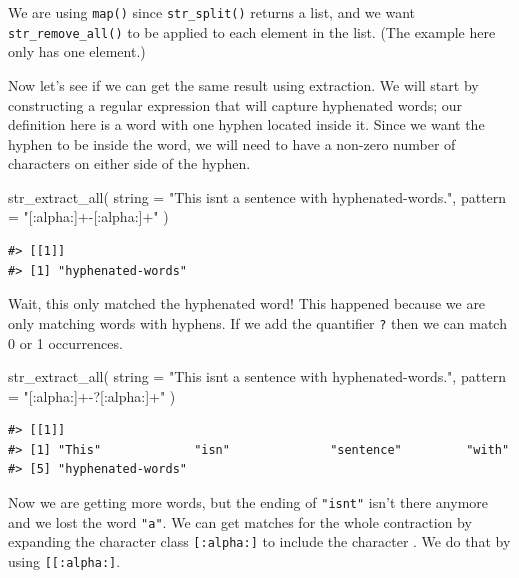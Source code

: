\documentclass[
]{krantz}
\makeatletter
\newenvironment{Shaded}{\begin{snugshade}}{\end{snugshade}}
\newcommand{\AttributeTok}[1]{\textcolor[rgb]{0.77,0.63,0.00}{#1}}
\newcommand{\FunctionTok}[1]{\textcolor[rgb]{0.00,0.00,0.00}{#1}}
\newcommand{\NormalTok}[1]{#1}
\newcommand{\StringTok}[1]{\textcolor[rgb]{0.31,0.60,0.02}{#1}}
\newenvironment{kframe}{%
\medskip{}
\setlength{\fboxsep}{.8em}
 \def\at@end@of@kframe{}%
 \ifinner\ifhmode%
  \def\at@end@of@kframe{\end{minipage}}%
  \begin{minipage}{\columnwidth}%
 \fi\fi%
 \def\FrameCommand##1{\hskip\@totalleftmargin \hskip-\fboxsep
 \colorbox{shadecolor}{##1}\hskip-\fboxsep
     \hskip-\linewidth \hskip-\@totalleftmargin \hskip\columnwidth}%
 \MakeFramed {\advance\hsize-\width
   \@totalleftmargin\z@ \linewidth\hsize
   \@setminipage}}%
 {\par\unskip\endMakeFramed%
 \at@end@of@kframe}
\renewenvironment{Shaded}{\begin{kframe}}{\end{kframe}}
\makeatother
\begin{document}
We are using \texttt{map()} since \texttt{str\_split()} returns a list, and we want \texttt{str\_remove\_all()} to be applied to each element in the list. (The example here only has one element.)

Now let's see if we can get the same result using extraction. We will start by constructing a regular expression that will capture hyphenated words; our definition here is a word with one hyphen located inside it. Since we want the hyphen to be inside the word, we will need to have a non-zero number of characters on either side of the hyphen.

\begin{Shaded}
\begin{Highlighting}[]
\FunctionTok{str\_extract\_all}\NormalTok{(}
  \AttributeTok{string =} \StringTok{"This isn\textquotesingle{}t a sentence with hyphenated{-}words."}\NormalTok{,}
  \AttributeTok{pattern =} \StringTok{"[:alpha:]+{-}[:alpha:]+"}
\NormalTok{)}
\end{Highlighting}
\end{Shaded}

\begin{verbatim}
#> [[1]]
#> [1] "hyphenated-words"
\end{verbatim}

Wait, this only matched the hyphenated word! This happened because we are only matching words with hyphens. If we add the quantifier \texttt{?} then we can match 0 or 1 occurrences.

\begin{Shaded}
\begin{Highlighting}[]
\FunctionTok{str\_extract\_all}\NormalTok{(}
  \AttributeTok{string =} \StringTok{"This isn\textquotesingle{}t a sentence with hyphenated{-}words."}\NormalTok{,}
  \AttributeTok{pattern =} \StringTok{"[:alpha:]+{-}?[:alpha:]+"}
\NormalTok{)}
\end{Highlighting}
\end{Shaded}

\begin{verbatim}
#> [[1]]
#> [1] "This"             "isn"              "sentence"         "with"            
#> [5] "hyphenated-words"
\end{verbatim}

Now we are getting more words, but the ending of \texttt{"isn\textquotesingle{}t"} isn't there anymore and we lost the word \texttt{"a"}. We can get matches for the whole contraction by expanding the character class \texttt{{[}:alpha:{]}} to include the character \texttt{\textquotesingle{}}. We do that by using \texttt{{[}{[}:alpha:{]}\textquotesingle{}{]}}.
\end{document}
